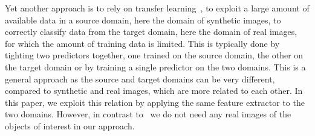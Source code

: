 \documentclass[10pt,twocolumn,letterpaper]{article}
\newcommand{\vincentrmk}[1]{{\color{ForestGreen}\bf #1}}
\newcommand{\stefanrmk}[1]{{\color{DarkRed}\bf #1}}
\newcommand{\paulrmk}[1]{{\color{DarkMagenta}\bf #1}}
\newcommand{\comment}[1]{}
\begin{document}
Yet      another       approach      is      to      rely       on      transfer
learning~\cite{Rozantsev17,bousmalis2016domain,ganin2016domain},  to  exploit  a
large amount of available data in a  source domain, here the domain of synthetic
images, to correctly  classify data from  the target domain,  here the
domain of real images, for which the amount of training data is limited. This is
typically done  by tighting two predictors  together, one trained on  the source
domain, the other on the target domain or by training a
  single predictor on the two domains. This is a general approach as the source
and target domains can be very different, compared to synthetic and real images,
which are more related to each other. In this paper, we exploit this relation by applying
the same feature extractor to the two domains. However, in contrast to~\cite{Rozantsev17,bousmalis2016domain,ganin2016domain} we do not need any real
images of the objects of interest in our approach.
\comment{
\stefanrmk{Actually we need real background images: however we don't need real images containing the objects of interest.}
\paulrmk{Most of the approaches, except for Rozantsev17, use shared
  weights though, so it's really only one predictor.}\vincentrmk{with
  deep learning yes, but not for older papers.}}
\end{document}

